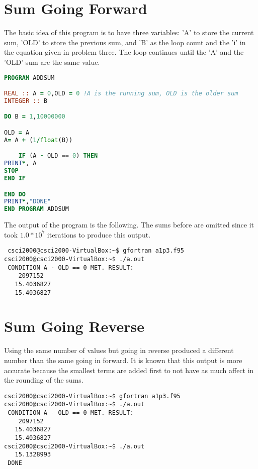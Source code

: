 \documentclass[12pt]{article}
\begin{document}
\section{Sum Going Forward}
The basic idea of this program is to have three variables: 'A' to store the current sum, 'OLD' to store the previous sum, and 'B' as the loop count and the 'i' in the equation given in problem three. The loop continues until the 'A' and the 'OLD' sum are the same value. 
\begin{lstlisting}[language= Fortran]
PROGRAM ADDSUM

REAL :: A = 0,OLD = 0 !A is the running sum, OLD is the older sum
INTEGER :: B

DO B = 1,10000000

OLD = A
A= A + (1/float(B))

    IF (A - OLD == 0) THEN
PRINT*, A
STOP
END IF

END DO
PRINT*,"DONE"
END PROGRAM ADDSUM


\end{lstlisting}
The output of the program is the following. The sums before are omitted since it took $1.0*10^{7}$ iterations to produce this output. 
\begin{verbatim}
 csci2000@csci2000-VirtualBox:~$ gfortran a1p3.f95
csci2000@csci2000-VirtualBox:~$ ./a.out
 CONDITION A - OLD == 0 MET. RESULT:
 	2097152
   15.4036827    
   15.4036827    
\end{verbatim}
\section{Sum Going Reverse}
Using the same number of values but going in reverse produced a different number than the same going in forward. It is known that this output is more accurate because the smallest terms are added first to not have as much affect in the rounding of the sums. 
\begin{verbatim}
csci2000@csci2000-VirtualBox:~$ gfortran a1p3.f95
csci2000@csci2000-VirtualBox:~$ ./a.out
 CONDITION A - OLD == 0 MET. RESULT:
 	2097152
   15.4036827    
   15.4036827    
csci2000@csci2000-VirtualBox:~$ ./a.out
   15.1328993    
 DONE

\end{verbatim}
\newpage
\end{document}
